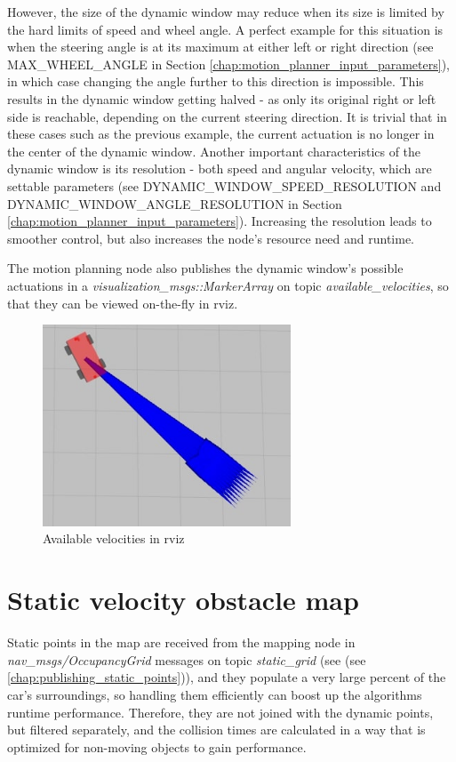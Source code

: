 However, the size of the dynamic window may reduce when its size is limited by the hard limits of speed and wheel angle. A perfect example for this situation is when the steering angle is at its maximum at either left or right direction (see MAX\_WHEEL\_ANGLE in Section \ref{chap:motion_planner_input_parameters}), in which case changing the angle further to this direction is impossible. This results in the dynamic window getting halved - as only its original right or left side is reachable, depending on the current steering direction. It is trivial that in these cases such as the previous example, the current actuation is no longer in the center of the dynamic window.
Another important characteristics of the dynamic window is its resolution - both speed and angular velocity, which are settable parameters (see DYNAMIC\_WINDOW\_SPEED\_RESOLUTION and DYNAMIC\_WINDOW\_ANGLE\_RESOLUTION in Section \ref{chap:motion_planner_input_parameters}). Increasing the resolution leads to smoother control, but also increases the node's resource need and runtime.

The motion planning node also publishes the dynamic window's possible actuations in a \textit{visualization\_msgs::MarkerArray} \cite{ros_msg_MarkerArray} on topic \textit{available\_velocities}, so that they can be viewed on-the-fly in rviz.

\begin{figure}[!ht]
    \centering
    \includegraphics[height=60mm]{figures/raw/jpeg/rviz_available_velocities.jpg}
    \caption{Available velocities in rviz}
    \label{rviz_available_velocities}
\end{figure}

\section{Static velocity obstacle map}
\label{chap:static_velocity_obstacle_map}
Static points in the map are received from the mapping node in \textit{nav\_msgs/OccupancyGrid} \cite{ros_msg_OccupancyGrid} messages on topic \textit{static\_grid} (see (see \ref{chap:publishing_static_points})), and they populate a very large percent of the car's surroundings, so handling them efficiently can boost up the algorithms runtime performance. Therefore, they are not joined with the dynamic points, but filtered separately, and the collision times are calculated in a way that is optimized for non-moving objects to gain performance.

